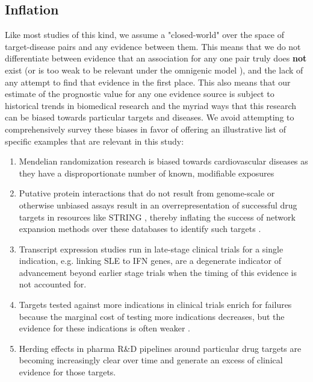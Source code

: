 \documentclass{article}
\begin{document}
\subsection{Inflation}
\label{sec:results_inflation}

Like most studies of this kind, we assume a "closed-world" \cite{Paliwal2020-hr} over the space of target-disease pairs and any evidence between them. This means that we do not differentiate between evidence that an association for any one pair truly does \textbf{not} exist (or is too weak to be relevant under the omnigenic model \cite{PMID:28622505}), and the lack of any attempt to find that evidence in the first place. This also means that our estimate of the prognostic value for any one evidence source is subject to historical trends in biomedical research and the myriad ways that this research can be biased towards particular targets and diseases. We avoid attempting to comprehensively survey these biases in favor of offering an illustrative list of specific examples that are relevant in this study:

\begin{enumerate}
\item Mendelian randomization research is biased towards cardiovascular diseases as they have a disproportionate number of known, modifiable exposures \cite{PMID:36736292}
\item Putative protein interactions that do not result from genome-scale or otherwise unbiased assays result in an overrepresentation of successful drug targets in resources like STRING \cite{PMID:36370105}, thereby inflating the success of network expansion methods over these databases to identify such targets \cite{Sadler2023-xd}.
\item Transcript expression studies run in late-stage clinical trials for a single indication, e.g. \cite{PMID:27723281} linking SLE to IFN genes, are a degenerate indicator of advancement beyond earlier stage trials when the timing of this evidence is not accounted for.
\item Targets tested against more indications in clinical trials enrich for failures because the marginal cost of testing more indications decreases, but the evidence for these indications is often weaker \cite{PMID:33262371}.
\item Herding effects in pharma R\&D pipelines around particular drug targets are becoming increasingly clear over time \cite{PMID:37117303} and generate an excess of clinical evidence for those targets.
\end{enumerate}
\end{document}
